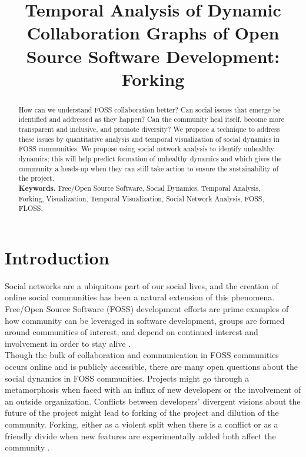 \documentclass[conference]{IEEEtran}
\title{Temporal Analysis of Dynamic Collaboration Graphs of Open Source Software Development: Forking}
\author{\IEEEauthorblockN{Amir Azarbakht\\}
\IEEEauthorblockA{School of Electrical Engineering and Computer Science\\
Oregon State University\\
Corvallis, Oregon 97331\\
Email: azarbaam@eecs.oregonstate.edu}}
\begin{document}
\date{}
\maketitle


\begin{abstract}
How can we understand FOSS collaboration better? Can social issues that emerge be identified and addressed as they happen? Can the community heal itself, become more transparent and inclusive, and promote diversity? We propose a technique to address these issues by quantitative analysis and temporal visualization of social dynamics in FOSS communities. We propose using social network analysis to identify unhealthy dynamics; this will help predict formation of unhealthy dynamics and which gives the community a heads-up when they can still take action to ensure the sustainability of the project.\\

\textbf{Keywords.} Free/Open Source Software, Social Dynamics, Temporal Analysis, Forking, Visualization, Temporal Visualization, Social Network Analysis, FOSS, FLOSS.
\end{abstract}

\section{Introduction}
\label{introduction}
Social networks are a ubiquitous part of our social lives, and the creation of online social communities has been a natural extension of this phenomena. Free/Open Source Software (FOSS) development efforts are prime examples of how community can be leveraged in software development, groups are formed around communities of interest, and depend on continued interest and involvement in order to stay alive \cite{NymanCodeForking}.\\

Though the bulk of collaboration and communication in FOSS communities occurs online and is publicly accessible, there are many open questions about the social dynamics in FOSS communities. Projects might go through a metamorphosis when faced with an influx of new developers or the involvement of an outside organization. Conflicts between developers' divergent visions about the future of the project might lead to forking of the project and dilution of the community. Forking, either as a violent split when there is a conflict or as a friendly divide when new features are experimentally added both affect the community \cite{Bezrukova}.\\
\end{document}
